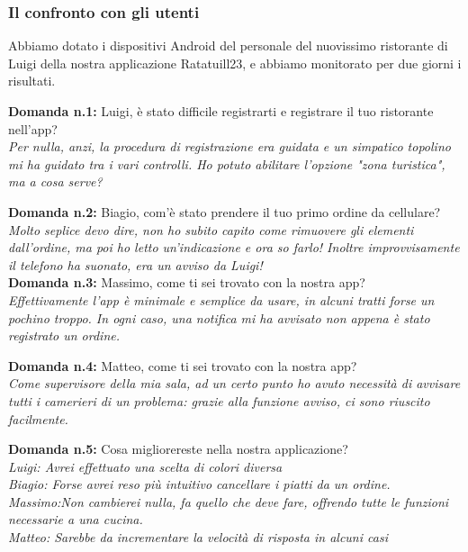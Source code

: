     \subsubsection{Il confronto con gli utenti}
        \begin{flushleft}
            Abbiamo dotato i dispositivi Android del personale del nuovissimo ristorante di Luigi della nostra applicazione Ratatuill23,
            e abbiamo monitorato per due giorni i risultati.

            \textbf{Domanda n.1:} Luigi, è stato difficile registrarti e registrare il tuo ristorante nell'app?\\
            \emph{Per nulla, anzi, la procedura di registrazione era guidata e un simpatico topolino mi ha guidato tra i vari controlli. Ho potuto abilitare l'opzione "zona turistica", ma a cosa serve?}\\
            \vspace{0.2cm}

            \textbf{Domanda n.2:} Biagio, com'è stato prendere il tuo primo ordine da cellulare?\\
            \emph{Molto seplice devo dire, non ho subito capito come rimuovere gli elementi dall'ordine, ma poi ho letto un'indicazione e ora so farlo! Inoltre improvvisamente il telefono ha suonato, era un avviso da Luigi!}\\
            \vspace{0.2cm}
            \newpage
            \textbf{Domanda n.3:} Massimo, come ti sei trovato con la nostra app?\\
            \emph{Effettivamente l'app è minimale e semplice da usare, in alcuni tratti forse un pochino troppo. In ogni caso, una notifica mi ha avvisato non appena è stato registrato un ordine.}
            
            \vspace{0.2cm}
            \textbf{Domanda n.4:} Matteo, come ti sei trovato con la nostra app?\\
            \emph{Come supervisore della mia sala, ad un certo punto ho avuto necessità di avvisare tutti i camerieri di un problema: grazie alla funzione avviso, ci sono riuscito facilmente.}
       
            \vspace{0.2cm}
            \textbf{Domanda n.5:} Cosa migliorereste nella nostra applicazione?\\
            \emph{Luigi: Avrei effettuato una scelta di colori diversa\\Biagio: Forse avrei reso più intuitivo cancellare i piatti da un ordine.\\Massimo:Non cambierei nulla, fa quello che deve fare, offrendo tutte le funzioni necessarie a una cucina.\\Matteo: Sarebbe da incrementare la velocità di risposta in alcuni casi}


\end{flushleft}
